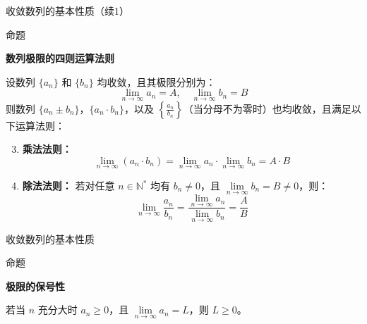 \documentclass[aspectratio=169,10pt,fontset=fandol]{ctexbeamer}
\newenvironment{custom}[1]{\par\noindent\textbf{#1}\quad}{\par\vspace{0.8em}}
\begin{document}
\begin{frame}[t,fragile]{收敛数列的基本性质（续1）}
\small
\begin{block}{命题}
{\small
\textbf{数列极限的四则运算法则}\par



设数列 $\{a_n\}$ 和 $\{b_n\}$ 均收敛，且其极限分别为：
\begin{equation*}
	\lim\limits_{n \to \infty} a_n = A, \quad \lim\limits_{n \to \infty} b_n = B
\end{equation*}
则数列 $\{a_n \pm b_n\}$，$\{a_n \cdot b_n\}$，以及 $\left\{\frac{a_n}{b_n}\right\}$（当分母不为零时）也均收敛，且满足以下运算法则：

\begin{enumerate}
	\setcounter{enumi}{2}
\item \textbf{乘法法则：}
	\begin{equation*}
		\lim_{n \to \infty} (a_n \cdot b_n) = \lim_{n \to \infty} a_n \cdot \lim_{n \to \infty} b_n = A \cdot B
	\end{equation*}
	
	\item \textbf{除法法则：}
	若对任意 $n \in \mathbb{N}^*$ 均有 $b_n \neq 0$，且 $\lim\limits_{n \to \infty} b_n = B \neq 0$，则：
	\begin{equation*}
		\lim_{n \to \infty} \frac{a_n}{b_n} = \frac{\lim\limits_{n \to \infty} a_n}{\lim\limits_{n \to \infty} b_n} = \frac{A}{B}
	\end{equation*}
\end{enumerate}

}
\end{block}
\end{frame}
\begin{frame}[t,fragile]{收敛数列的基本性质}
\normalsize
\begin{block}{命题}
{\normalsize
\textbf{极限的保号性}\par

	 若当 \(n\) 充分大时 \(a_n \geq 0\)，且 \(\lim\limits_{n \to \infty} a_n = L\)，则 \(L \geq 0\)。

}
\end{block}
\end{frame}
\end{document}
